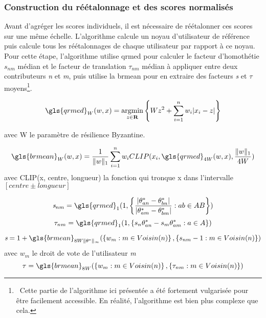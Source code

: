 \subsubsection{Construction du réétalonnage et des scores normalisés}

Avant d'agréger les scores individuels, il est nécessaire de réétalonner ces scores sur une même échelle. L'algorithme calcule un noyau d'utilisateur de référence puis calcule tous les réétalonnages de chaque utilisateur par rapport à ce noyau. Pour cette étape, l'algorithme utilise \gls{qrmed} pour calculer le facteur d'homothétie $\textit{s}_{nm}$ médian et le facteur de translation $\tau_{nm}$ médian à appliquer entre deux contributeurs \textit{n} et \textit{m}, puis utilise la \gls{brmean} pour en extraire des facteurs \textit{s} et $\tau$ moyens\footnote{~Cette partie de l'algorithme ici présentée a été fortement vulgarisée pour être facilement accessible. En réalité, l'algorithme est bien plus complexe que cela.}.

\begin{equation}
    \gls{qrmed}_W(w,x) = \operatorname*{argmin}_{z \in \mathbf{R}} \set{ Wz^2 + \sum_{i=1}^n w_i|x_i-z|}
\end{equation}

avec W le paramètre de résilience Byzantine.

\begin{equation}
    \gls{brmean}_W(w,x) = \frac{1}{\lVert w \rVert_1} \sum_{i=1}^n w_iCLIP(x_i,\gls{qrmed}_{4W}(w,x),
    \frac{\lVert w \rVert_1}{4W})
\end{equation}
avec CLIP(x, centre, longueur) la fonction qui tronque x dans l'intervalle $[centre \pm longueur]$

\begin{equation}
    \textit{s}_{nm}= \gls{qrmed}_1(1,\set{ \frac{|\score_{an}-\score_{bn}|}{|\score_{am}-\score_{bm}|} : ab \in AB})
\end{equation}
\begin{equation}
    \tau_{nm}= \gls{qrmed}_1(1,\set{ s_n\score_{an} - s_m\score_{am} : a \in A })
\end{equation}

\begin{equation}
\textit{s}=1+\gls{brmean}_{8W\lVert \score \rVert_\infty}(\set{w_m : m \in Voisin(n)},\set{s_{nm}-1 : m \in Voisin(n)})
\end{equation}
avec $w_m$ le droit de vote de l'utilisateur \textit{m}
\begin{equation}
\tau=  \gls{brmean}_{8W}(\set{w_m : m \in Voisin(n)},\set{\tau_{nm} : m \in Voisin(n)})
\end{equation}


